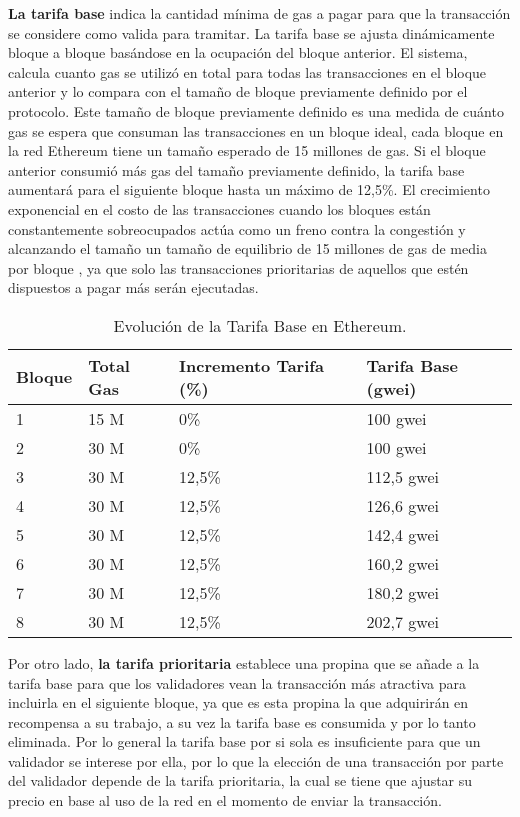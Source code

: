 \textbf{La tarifa base} indica la cantidad mínima de gas a pagar para que la transacción se considere como valida para tramitar.
La tarifa base se ajusta dinámicamente bloque a bloque basándose en la ocupación del bloque anterior. El sistema, calcula cuanto gas se utilizó en total para todas las transacciones en el bloque anterior y lo compara con el tamaño de bloque previamente definido por el protocolo. Este tamaño de bloque previamente definido es una medida de cuánto gas se espera que consuman las transacciones en un bloque ideal, cada bloque en la red Ethereum tiene un tamaño esperado de 15 millones de gas.
Si el bloque anterior consumió más gas del tamaño previamente definido, la tarifa base aumentará para el siguiente bloque hasta un máximo de 12,5\%. 
El crecimiento exponencial en el costo de las transacciones cuando los bloques están constantemente sobreocupados actúa como un freno contra la congestión y alcanzando el tamaño un tamaño de equilibrio de 15 millones de gas de media por bloque , ya que solo las transacciones prioritarias de aquellos que estén dispuestos a pagar más serán ejecutadas.

\begin{table}
\normalsize
\begin{centering}
	\begin{tabular}{@{}p{4em} p{5em} p{6em} p{6em}@{}}
		\toprule
		\textbf{Bloque} & \textbf{Total Gas} & \textbf{Incremento Tarifa (\%)} & \textbf{Tarifa Base (gwei)}\\ 
		\midrule
		1 & 15 M & 0\% & 100 gwei \\
		2 & 30 M & 0\% & 100 gwei\\
		3 & 30 M & 12,5\% & 112,5 gwei\\
		4 & 30 M & 12,5\% & 126,6 gwei\\
		5 & 30 M & 12,5\% & 142,4 gwei\\
		6 & 30 M & 12,5\% & 160,2 gwei\\
		7 & 30 M & 12,5\% & 180,2 gwei\\
		8 & 30 M & 12,5\% & 202,7 gwei\\
		\bottomrule
	\end{tabular}
\caption[Ajuste de la Tarifa Base Bajo Demanda]{Evolución de la Tarifa Base en Ethereum.}
\label{tabla:ajuste_tarifa_base}
\end{centering}
\end{table}


Por otro lado, \textbf{la tarifa prioritaria} establece una propina que se añade a la tarifa base para que los validadores vean la transacción más atractiva para incluirla en el siguiente bloque, ya que es esta propina la que adquirirán en recompensa a su trabajo, a su vez la tarifa base es consumida y por lo tanto eliminada.
Por lo general la tarifa base por si sola es insuficiente para que un validador se interese por ella, por lo que la elección de una transacción por parte del validador depende de la tarifa prioritaria, la cual se tiene que ajustar su precio en base al uso de la red en el momento de enviar la transacción.

